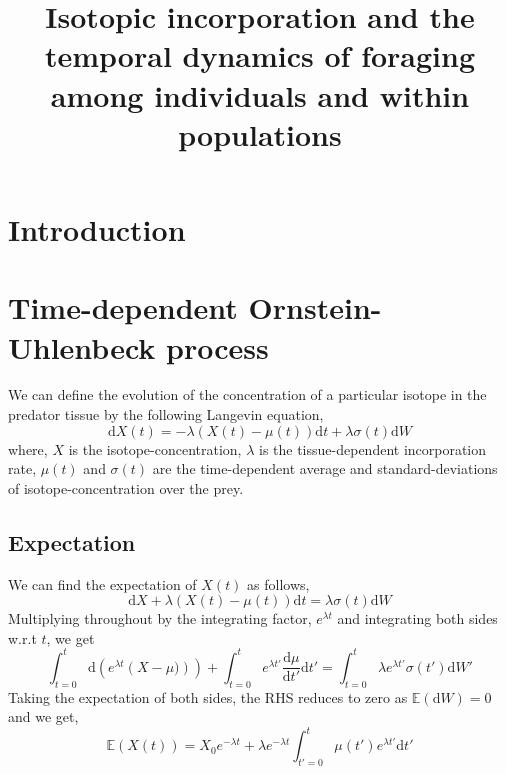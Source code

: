 \documentclass[12pt]{iopart}
\begin{document}
\title{Isotopic incorporation and the temporal dynamics of foraging among individuals and within populations}
\begin{abstract}
\end{abstract}
\maketitle

\section{Introduction}

\section{Time-dependent Ornstein-Uhlenbeck process}
We can define the evolution of the concentration of a particular isotope in the predator tissue by the following Langevin equation,
\begin{equation}
\label{langevin}
\mathrm{d}X(t) = - \lambda\left(X(t)-\mu(t)\right)\mathrm{d}t + \lambda\sigma(t)\mathrm{d}W
\end{equation}
where, $X$ is the isotope-concentration, $\lambda$ is the tissue-dependent incorporation rate, $\mu(t)$ and $\sigma(t)$ are the time-dependent average and standard-deviations of isotope-concentration over the prey.
\subsection{Expectation}
 We can find the expectation of $X(t)$ as follows,
\begin{equation}
\label{EX1}
\mathrm{d}X + \lambda\left(X(t)-\mu(t)\right)\mathrm{d}t = \lambda\sigma(t)\mathrm{d}W
\end{equation}
Multiplying throughout by the integrating factor, $e^{\lambda t}$ and integrating both sides w.r.t $t$, we get
\begin{equation}
\label{EX2}
\int_{t=0}^t \mathrm{d}\left(e^{\lambda t}\left(X-\mu)\right)\right) + \int_{t=0}^t e^{\lambda t'}\frac{\mathrm{d}\mu}{\mathrm{d}t'}\mathrm{d}t' = \int_{t=0}^t\lambda e^{\lambda t'}\sigma(t')\mathrm{d}W'
\end{equation}
Taking the expectation of both sides, the RHS reduces to zero as $\mathbb{E}(\mathrm{d}W)=0$ and we get,
\begin{equation}
\label{EX-final}
\mathbb{E}(X(t)) = X_0 e^{-\lambda t} + \lambda e^{-\lambda t}\int_{t'=0}^t\mu(t')e^{\lambda t'}\mathrm{d}t'
\end{equation}
\end{document}
